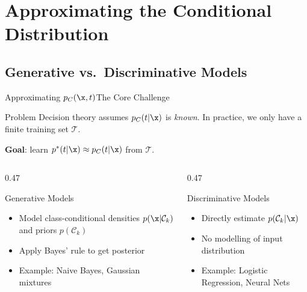 \section{Approximating the Conditional Distribution}

\subsection{Generative vs.\ Discriminative Models}

\begin{frame}{Approximating $p_C(\x, t)$}{The Core Challenge}
  \begin{alertblock}{Problem}
    Decision theory assumes $p_C(t|\x)$ is \emph{known}. In practice, we only have a finite training set $\mathcal{T}$.
  \end{alertblock}

  \textbf{Goal}: learn $p^*(t|\x) \approx p_C(t|\x)$ from $\mathcal{T}$.

  \bigskip
  \begin{columns}
    \begin{column}{0.47\textwidth}
      \begin{block}{Generative Models}
        \begin{itemize}
          \item Model class-conditional densities $p(\x|\mathcal{C}_k)$ and priors $p(\mathcal{C}_k)$
          \item Apply Bayes' rule to get posterior
          \item Example: Naive Bayes, Gaussian mixtures
        \end{itemize}
      \end{block}
    \end{column}
    \begin{column}{0.47\textwidth}
      \begin{block}{Discriminative Models}
        \begin{itemize}
          \item Directly estimate $p(\mathcal{C}_k|\x)$
          \item No modelling of input distribution
          \item Example: Logistic Regression, Neural Nets
        \end{itemize}
      \end{block}
    \end{column}
  \end{columns}
\end{frame}

